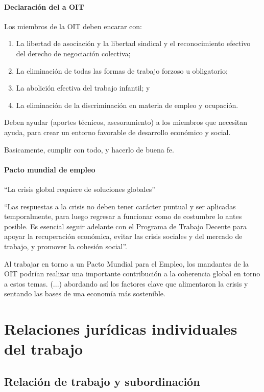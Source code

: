 \documentclass[spanish,12pt,a4paper,titlepage]{report}
\begin{document}
\subsection{Declaración del a OIT}
\label{sec:declaracion-de-la-oit}

Los miembros de la OIT deben encarar con:
\begin{enumerate}
\item La libertad de asociación y la libertad sindical y el reconocimiento efectivo del derecho de negociación colectiva; 
\item La eliminación de todas las formas de trabajo forzoso u obligatorio;
\item La abolición efectiva del trabajo infantil; y
\item La eliminación de la discriminación en materia de empleo y ocupación. 
\end{enumerate}

Deben ayudar (aportes técnicos, asesoramiento) a los miembros que necesitan ayuda, para crear un entorno favorable de desarrollo económico y social.

Basicamente, cumplir con todo, y hacerlo de buena fe.

\subsection{Pacto mundial de empleo}
\label{sec:pacto-mundial-de-empleo}

“La crisis global requiere de soluciones globales”

“Las respuestas a la crisis no deben tener carácter puntual y ser aplicadas temporalmente, para luego regresar a funcionar como de costumbre lo antes posible. Es esencial seguir adelante con el Programa de Trabajo Decente para apoyar la recuperación económica, evitar las crisis sociales y del mercado de trabajo, y promover la cohesión social”.

Al trabajar en torno a un Pacto Mundial para el Empleo, los mandantes de la OIT podrían realizar una importante contribución a la coherencia global en torno a estos temas. (...) abordando así los factores clave que alimentaron la crisis y sentando las bases de una economía más sostenible.


\part{Relaciones jurídicas individuales del trabajo}

\chapter{Relación de trabajo y subordinación}
\end{document}
